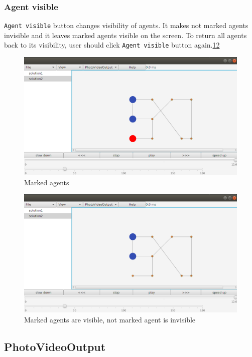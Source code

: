 \documentclass[thesis=B,english]{FITthesis}[2019/12/23]
\begin{document}
\subsubsection{Agent visible}

\verb|Agent visible| button changes visibility of agents. It makes not marked agents invisible and it leaves marked agents visible on the screen. To return all agents back to its visibility, user should click \verb|Agent visible| button again.\ref{fig:float17}\ref{fig:float18} 

\begin{figure}
	\includegraphics[scale=0.34]{markedagent.png}
	\caption[Marked agent]{Marked agents}\label{fig:float17}
\end{figure}

\begin{figure}
	\includegraphics[scale=0.34]{unvisibleagent.png}
	\caption[Visibility agents]{Marked agents are visible, not marked agent is invisible}\label{fig:float18}
\end{figure}

\subsection{PhotoVideoOutput}
\end{document}
